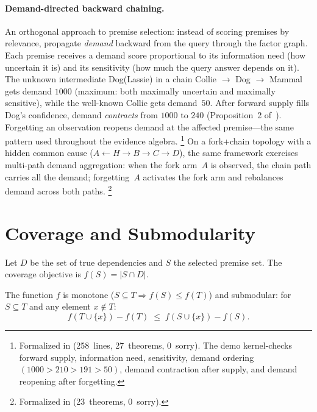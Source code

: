 \documentclass[11pt,openany]{report}
\begin{document}
\paragraph{Demand-directed backward chaining.}
An orthogonal approach to premise selection: instead of scoring
premises by relevance, propagate \emph{demand} backward from the
query through the factor graph.  Each premise receives a demand
score proportional to its information need (how uncertain it is)
and its sensitivity (how much the query answer depends on it).
The unknown intermediate Dog(Lassie) in a chain
Collie $\to$ Dog $\to$ Mammal gets demand $1000$ (maximum: both
maximally uncertain and maximally sensitive), while the well-known
Collie gets demand~$50$.  After forward supply fills Dog's
confidence, demand \emph{contracts} from $1000$ to $240$
(Proposition~2 of~\cite{Goertzel2026BackwardChaining}).
Forgetting an observation reopens demand at the affected
premise---the same  pattern used throughout the
evidence algebra.%
\footnote{Formalized in
(258~lines, 27~theorems, 0~sorry).  The demo kernel-checks
forward supply, information need, sensitivity, demand ordering
$(1000 > 210 > 191 > 50)$, demand contraction after supply, and
demand reopening after forgetting.}
On a fork+chain topology with a hidden common cause
($A \leftarrow H \to B \to C \to D$), the same framework
exercises multi-path demand aggregation: when the fork arm~$A$ is
observed, the chain path carries all the demand; forgetting~$A$
activates the fork arm and rebalances demand across both paths.%
\footnote{Formalized in
(23~theorems, 0~sorry).}


\section{Coverage and Submodularity}
\label{sec:coverage}

Let $D$ be the set of true dependencies and $S$ the selected premise
set.  The coverage objective is $f(S) = |S \cap D|$.

\begin{theorem}
\label{thm:coverage-submod}
The function $f$ is monotone ($S \subseteq T \Rightarrow f(S) \le f(T)$)
and submodular: for $S \subseteq T$ and any element $x \notin T$:
\[
  f(T \cup \{x\}) - f(T) \;\le\; f(S \cup \{x\}) - f(S).
\]
\end{theorem}
\end{document}
